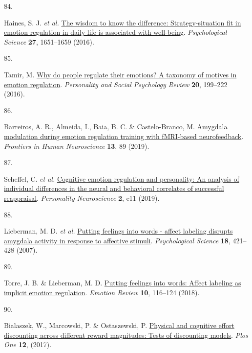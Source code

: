 \documentclass[
  man,floatsintext]{apa6}
\newlength{\cslhangindent}
\newlength{\csllabelwidth}
\newlength{\cslentryspacingunit} %
\newenvironment{CSLReferences}[2] %
 {%
  \setlength{\parindent}{0pt}
  \ifodd #1
  \let\oldpar\par
  \def\par{\hangindent=\cslhangindent\oldpar}
  \fi
  \setlength{\parskip}{#2\cslentryspacingunit}
 }%
 {}
\newcommand{\CSLLeftMargin}[1]{\parbox[t]{\csllabelwidth}{#1}}
\newcommand{\CSLRightInline}[1]{\parbox[t]{\linewidth - \csllabelwidth}{#1}\break}
\begin{document}
\begin{CSLReferences}{0}{0}
\leavevmode{}%
\CSLLeftMargin{84. }%
\CSLRightInline{Haines, S. J. \emph{et al.} \href{https://doi.org/10.1177/0956797616669086}{The wisdom to know the difference: Strategy-situation fit in emotion regulation in daily life is associated with well-being}. \emph{Psychological Science} \textbf{27}, 1651--1659 (2016).}

\leavevmode{}%
\CSLLeftMargin{85. }%
\CSLRightInline{Tamir, M. \href{https://doi.org/10.1177/1088868315586325}{Why do people regulate their emotions? A taxonomy of motives in emotion regulation}. \emph{Personality and Social Psychology Review} \textbf{20}, 199--222 (2016).}

\leavevmode{}%
\CSLLeftMargin{86. }%
\CSLRightInline{Barreiros, A. R., Almeida, I., Baia, B. C. \& Castelo-Branco, M. \href{https://doi.org/10.3389/fnhum.2019.00089}{Amygdala modulation during emotion regulation training with fMRI-based neurofeedback}. \emph{Frontiers in Human Neuroscience} \textbf{13}, 89 (2019).}

\leavevmode{}%
\CSLLeftMargin{87. }%
\CSLRightInline{Scheffel, C. \emph{et al.} \href{https://doi.org/10.1017/pen.2019.11}{Cognitive emotion regulation and personality: An analysis of individual differences in the neural and behavioral correlates of successful reappraisal}. \emph{Personality Neuroscience} \textbf{2}, e11 (2019).}

\leavevmode{}%
\CSLLeftMargin{88. }%
\CSLRightInline{Lieberman, M. D. \emph{et al.} \href{https://doi.org/10.1111/j.1467-9280.2007.01916.x}{Putting feelings into words - affect labeling disrupts amygdala activity in response to affective stimuli}. \emph{Psychological Science} \textbf{18}, 421--428 (2007).}

\leavevmode{}%
\CSLLeftMargin{89. }%
\CSLRightInline{Torre, J. B. \& Lieberman, M. D. \href{https://doi.org/10.1177/1754073917742706}{Putting feelings into words: Affect labeling as implicit emotion regulation}. \emph{Emotion Review} \textbf{10}, 116--124 (2018).}

\leavevmode{}%
\CSLLeftMargin{90. }%
\CSLRightInline{Bialaszek, W., Marcowski, P. \& Ostaszewski, P. \href{https://doi.org/ARTN\%20e0182353\%0A10.1371/journal.pone.0182353}{Physical and cognitive effort discounting across different reward magnitudes: Tests of discounting models}. \emph{Plos One} \textbf{12}, (2017).}


\end{CSLReferences}
\end{document}
